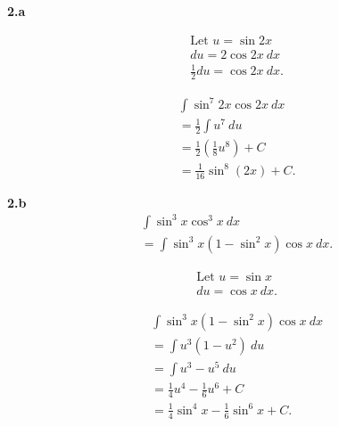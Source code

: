 \documentclass{report}
\begin{document}
        \bigbreak \noindent 
    \textbf{2.a}
    \bigbreak \noindent 
    \begin{minipage}[t]{0.47\textwidth}
        \begin{align*}
            &\text{Let $u=\sin{2x}$} \\
            &du = 2\cos{2x}\ dx \\
            &\frac{1}{2}du = \cos{2x}\ dx
        .\end{align*}
    \end{minipage}
    \begin{minipage}[t]{0.47\textwidth}
        \begin{align*}
            &\int \sin^{7}{2x}\cos{2x}\ dx \\
            &=\frac{1}{2}\int u^{7}\ du \\
            &= \frac{1}{2}\left(\frac{1}{8}u^{8}\right) + C \\
            &= \frac{1}{16}\sin^{8}{(2x)} + C
        .\end{align*}
    \end{minipage}

    \bigbreak \noindent 
    \textbf{2.b}
    \bigbreak \noindent 
    \begin{align*}
        &\int \sin^{3}{x}\cos^{3}{x}\ dx \\
        &=\int \sin^{3}{x}(1-\sin^{2}{x})\cos{x}\ dx
    .\end{align*}
    \bigbreak \noindent 
    \begin{minipage}[t]{0.47\textwidth}
        \begin{align*}
            &\text{Let $u=\sin{x}$} \\
            &du = \cos{x}\ dx
        .\end{align*}
    \end{minipage}
    \begin{minipage}[t]{0.47\textwidth}
        \begin{align*}
            &\int \sin^{3}{x}(1-\sin^{2}{x})\cos{x}\ dx \\
            &=\int u^{3}(1-u^{2})\ du \\
            &=\int u^{3} -u^{5}\ du \\
            &= \frac{1}{4}u^{4} - \frac{1}{6}u^{6} + C \\
            &= \frac{1}{4}\sin^{4}{x} - \frac{1}{6}\sin^{6}{x} + C
        .\end{align*}
    \end{minipage}
\end{document}
